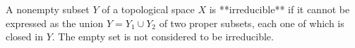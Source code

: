 A nonempty subset $Y$ of a topological space $X$ is **irreducible** if it cannot be expressed as the union $Y = Y_1 \cup Y_2$ of two proper subsets, each one of which is closed in $Y$. The empty set is not considered to be irreducible.
